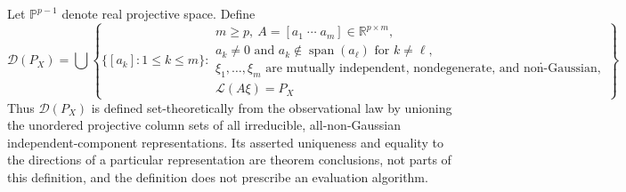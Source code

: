 Let \(\mathbb P^{p-1}\) denote real projective space. Define
\[
 \mathcal D(P_X)
 =\bigcup\left\{
   \{[a_k]:1\le k\le m\}:
   \begin{array}{l}
   m\ge p,\ A=[a_1\;\cdots\;a_m]\in\mathbb R^{p\times m},\ \\
   a_k\ne0\text{ and }a_k\notin\operatorname{span}(a_\ell)\text{ for }k\ne\ell,\\
   \xi_1,\ldots,\xi_m\text{ are mutually independent, nondegenerate, and non-Gaussian},\\
   \mathcal L(A\xi)=P_X
   \end{array}
 \right\}.
\]
Thus \(\mathcal D(P_X)\) is defined set-theoretically from the observational law by unioning the unordered projective column sets of all irreducible, all-non-Gaussian independent-component representations. Its asserted uniqueness and equality to the directions of a particular representation are theorem conclusions, not parts of this definition, and the definition does not prescribe an evaluation algorithm.